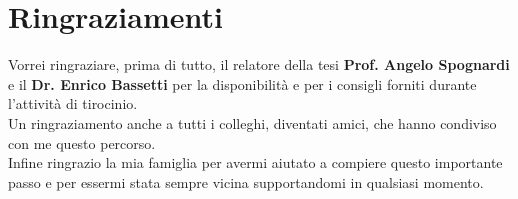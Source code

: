 \documentclass[binding=0.6cm,TFA]{sapthesis}
\begin{document}
\chapter*{Ringraziamenti}
\begin{large}
Vorrei ringraziare, prima di tutto, il relatore della tesi \textbf{Prof. Angelo Spognardi} e il \textbf{Dr. Enrico Bassetti} per la disponibilità e per i consigli forniti durante l'attività di tirocinio. \\

Un ringraziamento anche a tutti i colleghi, diventati amici, che hanno condiviso con me questo percorso. \\

Infine ringrazio la mia famiglia per avermi aiutato a compiere questo importante passo e per essermi stata sempre vicina supportandomi in qualsiasi momento.
\end{large}

\end{document}
